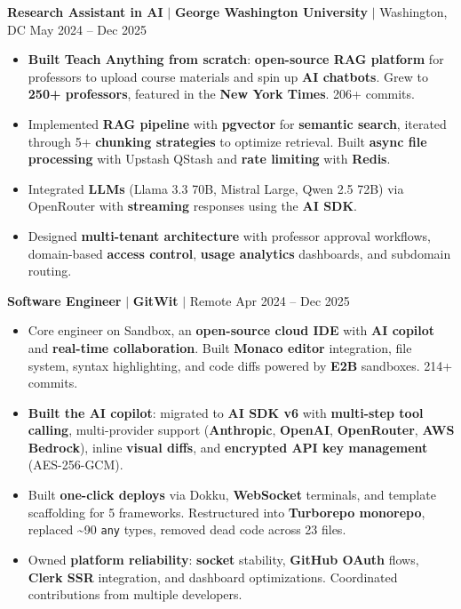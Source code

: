 \documentclass[10pt,a4paper]{article}
\begin{document}
\vspace{1pt}
\textbf{Research Assistant in AI} $|$ \textbf{George Washington University} $|$ Washington, DC \hfill May 2024 -- Dec 2025
\begin{itemize}
    \item \textbf{Built Teach Anything from scratch}: \textbf{open-source RAG platform} for professors to upload course materials and spin up \textbf{AI chatbots}. Grew to \textbf{250+ professors}, featured in the \textbf{New York Times}. 206+ commits.
    \item Implemented \textbf{RAG pipeline} with \textbf{pgvector} for \textbf{semantic search}, iterated through 5+ \textbf{chunking strategies} to optimize retrieval. Built \textbf{async file processing} with Upstash QStash and \textbf{rate limiting} with \textbf{Redis}.
    \item Integrated \textbf{LLMs} (Llama 3.3 70B, Mistral Large, Qwen 2.5 72B) via OpenRouter with \textbf{streaming} responses using the \textbf{AI SDK}.
    \item Designed \textbf{multi-tenant architecture} with professor approval workflows, domain-based \textbf{access control}, \textbf{usage analytics} dashboards, and subdomain routing.
\end{itemize}

\vspace{1pt}
\textbf{Software Engineer} $|$ \textbf{GitWit} $|$ Remote \hfill Apr 2024 -- Dec 2025
\begin{itemize}
    \item Core engineer on Sandbox, an \textbf{open-source cloud IDE} with \textbf{AI copilot} and \textbf{real-time collaboration}. Built \textbf{Monaco editor} integration, file system, syntax highlighting, and code diffs powered by \textbf{E2B} sandboxes. 214+ commits.
    \item \textbf{Built the AI copilot}: migrated to \textbf{AI SDK v6} with \textbf{multi-step tool calling}, multi-provider support (\textbf{Anthropic}, \textbf{OpenAI}, \textbf{OpenRouter}, \textbf{AWS Bedrock}), inline \textbf{visual diffs}, and \textbf{encrypted API key management} (AES-256-GCM).
    \item Built \textbf{one-click deploys} via Dokku, \textbf{WebSocket} terminals, and template scaffolding for 5 frameworks. Restructured into \textbf{Turborepo monorepo}, replaced \textasciitilde90 \texttt{any} types, removed dead code across 23 files.
    \item Owned \textbf{platform reliability}: \textbf{socket} stability, \textbf{GitHub OAuth} flows, \textbf{Clerk SSR} integration, and dashboard optimizations. Coordinated contributions from multiple developers.
\end{itemize}
\end{document}
